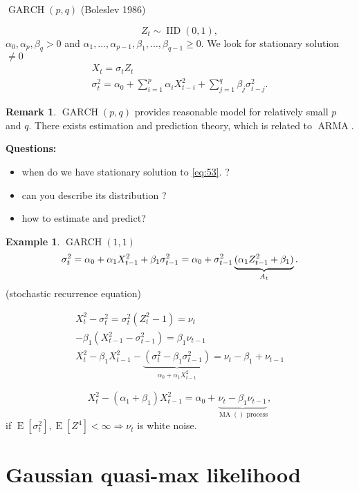 \documentclass[12pt,a4paper, notitlepage]{book}
\theoremstyle{definition} %
\newtheorem{example}{Example}[chapter]
\newtheorem*{remark}{Remark}
\theoremstyle{plain} %
\DeclareMathOperator{\E}{E}
\DeclareMathOperator{\Iid}{IID}
\DeclareMathOperator{\Arma}{ARMA}
\DeclareMathOperator{\Ma}{MA}
\DeclareMathOperator{\Garch}{GARCH}
\begin{document}
$\Garch(p,q) $ (Boleslev 1986)

\[ Z_t \sim \Iid(0,1) , \]
$ \alpha_0, \alpha_p, \beta_q >0 $ and $ \alpha_1, \ldots , \alpha_{p-1}, \beta_1, \ldots , \beta_{q-1} \geq 0 $. 
We look for stationary solution $ \neq 0 $
\begin{align*}
X_t = \sigma_t Z_t \\
\sigma_t ^2 = \alpha_0 + \sum _{i=1}^p \alpha_i X_{t-i}^2 + \sum_{j=1}^q \beta_j \sigma_{t-j}^2 .
\end{align*}

\begin{remark}
$ \Garch(p,q) $ provides reasonable model for relatively small $ p $ and $ q $.
There exists estimation and prediction theory, which is related to $ \Arma $.
\end{remark}

{\bf Questions: }
\begin{itemize}
\item when do we have stationary solution to \ref{eq:53}. ?
\item can you describe its distribution ?
\item how to estimate and predict?
\end{itemize}

\begin{example} $ \Garch(1,1) $ 
\[ \sigma_t^2 = \alpha_0 + \alpha_1 X_{t-1}^2 + \beta_1 \sigma_{t-1}^2  \\
= \alpha_0 + \sigma_{t-1}^2 \underbrace{(\alpha_1 Z_{t-1}^2 + \beta_1) }_{ A_t} . \]
(stochastic recurrence equation)

\begin{align*}
 X_t ^2 - \sigma_t^2 = \sigma_t ^2( Z_t^2 - 1) = \nu_t \\
- \beta_1(X_{t-1}^2 - \sigma_{t-1}^2) = \beta_1 \nu_{t-1} \\
X_t^2 - \beta_1 X_{t-1}^2 -  \underbrace{ ( \sigma_t^2 - \beta_1 \sigma_{t-1}^2)}_{ \alpha_0 + \alpha_1 X_{t-1}^2} = \nu_t - \beta_1 + \nu_{t-1} 
\end{align*}


\[ X_t^2 - (\alpha_1 + \beta_1) X_{t-1}^2 = \alpha_0 + \underbrace{ \nu_t - \beta_1 \nu_{t-1} }_{\Ma() \text{ process}} , \]
if $ \E[\sigma_t^2], \E[Z^4] < \infty \Rightarrow \nu _t $ is white noise.
\end{example}

\section{Gaussian quasi-max likelihood }
\end{document}
